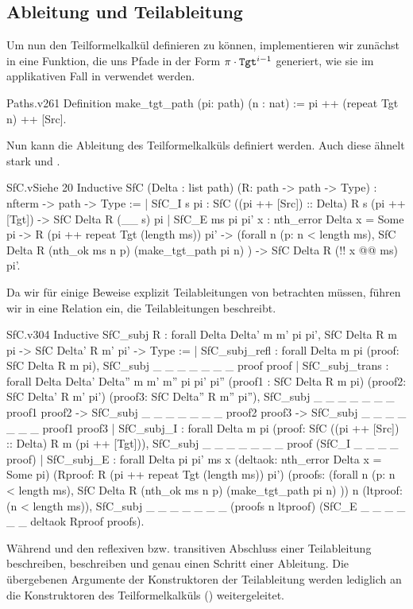 \subsection{Ableitung und Teilableitung}
Um nun den Teilformelkalkül definieren zu können, implementieren wir zunächst in  eine Funktion, die uns Pfade in der Form  $\pi\cdot\texttt{Tgt}^{i-1}$ generiert, wie sie im applikativen Fall in  verwendet werden.
\begin{code}{Paths.v}{}{261}
Definition make_tgt_path (pi: path) (n : nat) :=
    pi ++ (repeat Tgt n) ++ [Src].
\end{code}

Nun kann die Ableitung des Teilformelkalküls definiert werden. Auch diese ähnelt stark  und .

\begin{code}[SfC]{SfC.v}{Siehe }{20}
Inductive SfC (Delta : list path) (R: path -> path -> Type) : 
    nfterm -> path -> Type :=
  | SfC_I s pi : SfC ((pi ++ [Src]) :: Delta) R s (pi ++ [Tgt]) ->
      SfC Delta R (\__ s) pi
  | SfC_E ms pi pi' x : nth_error Delta x = Some pi -> 
      R (pi ++ repeat Tgt (length ms)) pi'  ->
        (forall n (p: n < length ms), 
            SfC Delta R (nth_ok ms n p) (make_tgt_path pi n) ) ->
          SfC Delta R (!! x @@ ms) pi'.
\end{code}

Da wir für einige Beweise explizit Teilableitungen von  betrachten müssen, führen wir in  eine Relation ein, die Teilableitungen beschreibt.
\begin{code}{SfC.v}{}{304}
Inductive SfC_subj R : forall Delta Delta' m m' pi pi', 
    SfC Delta R m pi -> SfC Delta' R m' pi' -> Type :=
  | SfC_subj_refl : forall Delta m pi (proof: SfC Delta R m pi), 
      SfC_subj _ _ _ _ _ _ _ proof proof
  | SfC_subj_trans : forall Delta Delta' Delta'' m m' m'' pi pi' pi'' 
      (proof1 : SfC Delta R m pi) 
      (proof2: SfC Delta' R m' pi') 
      (proof3: SfC Delta'' R m'' pi''),
        SfC_subj _ _ _ _ _ _ _ proof1 proof2 ->
          SfC_subj _ _ _ _ _ _ _ proof2 proof3 ->
            SfC_subj _ _ _ _ _ _ _ proof1 proof3
  | SfC_subj_I : forall Delta m pi (proof: SfC ((pi ++ [Src]) :: Delta) 
      R m (pi ++ [Tgt])),
        SfC_subj _ _ _ _ _ _ _ proof (SfC_I _ _ _ _ proof)
  | SfC_subj_E : forall Delta pi pi' ms x
      (deltaok: nth_error Delta x = Some pi)
      (Rproof: R (pi ++ repeat Tgt (length ms)) pi')
      (proofs: (forall n (p: n < length ms), 
        SfC Delta R (nth_ok ms n p) (make_tgt_path pi n) ))
      n (ltproof: (n < length ms)),
    SfC_subj _ _ _ _ _ _ _ (proofs n ltproof) 
       (SfC_E _ _ _ _ _ _ deltaok Rproof proofs).    
\end{code}
Während  und  den reflexiven bzw. transitiven Abschluss einer Teilableitung beschreiben, beschreiben  und  genau einen Schritt einer Ableitung. Die übergebenen Argumente der Konstruktoren der Teilableitung werden lediglich an die Konstruktoren des Teilformelkalküls () weitergeleitet. 

